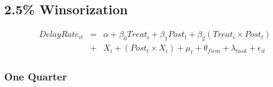 \documentclass[
]{article}
\begin{document}
\hypertarget{winsorization-1}{%
\subsection{2.5\% Winsorization}\label{winsorization-1}}

\[ \begin{aligned} DelayRate_{it} &=& \alpha+\beta_0 Treat_i + \beta_1 Post_t + \beta_2 (Treat_i \times Post_t)\\
&+&  X_i + (Post_t \times X_i) + \mu_t + \theta_{firm} + \lambda_{task}+ \epsilon_{it}
\end{aligned}\]

\hypertarget{one-quarter-1}{%
\subsubsection{One Quarter}\label{one-quarter-1}}
\end{document}

